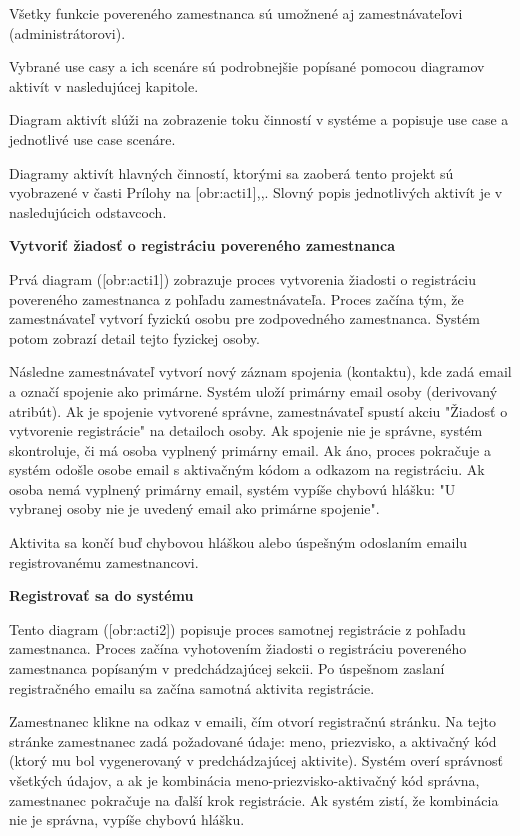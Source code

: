 Všetky funkcie povereného zamestnanca sú umožnené aj zamestnávateľovi (administrátorovi).

Vybrané use casy a ich scenáre sú podrobnejšie popísané pomocou diagramov aktivít v nasledujúcej kapitole.


Diagram aktivít slúži na zobrazenie toku činností v systéme a popisuje use case a jednotlivé use case scenáre.

Diagramy aktivít hlavných činností, ktorými sa zaoberá tento projekt sú vyobrazené v časti Prílohy na [obr:acti1],,. Slovný popis jednotlivých aktivít je v nasledujúcich odstavcoch.

\blank
\start\bf Vytvoriť žiadosť o registráciu povereného zamestnanca\stop

Prvá diagram ([obr:acti1]) zobrazuje proces vytvorenia žiadosti o registráciu povereného zamestnanca z pohľadu zamestnávateľa. Proces začína tým, že zamestnávateľ vytvorí fyzickú osobu pre zodpovedného zamestnanca. Systém potom zobrazí detail tejto fyzickej osoby. 

Následne zamestnávateľ vytvorí nový záznam spojenia (kontaktu), kde zadá email a označí spojenie ako primárne. Systém uloží primárny email osoby (derivovaný atribút). Ak je spojenie vytvorené správne, zamestnávateľ spustí akciu "Žiadosť o vytvorenie registrácie" na detailoch osoby. Ak spojenie nie je správne, systém skontroluje, či má osoba vyplnený primárny email. Ak áno, proces pokračuje a systém odošle osobe email s aktivačným kódom a odkazom na registráciu. Ak osoba nemá vyplnený primárny email, systém vypíše chybovú hlášku: "U vybranej osoby nie je uvedený email ako primárne spojenie".

Aktivita sa končí buď chybovou hláškou alebo úspešným odoslaním emailu registrovanému zamestnancovi.

\blank
\start\bf Registrovať sa do systému\stop

Tento diagram ([obr:acti2]) popisuje proces samotnej registrácie z pohľadu zamestnanca. Proces začína vyhotovením žiadosti o registráciu povereného zamestnanca popísaným v predchádzajúcej sekcii. Po úspešnom zaslaní registračného emailu sa začína samotná aktivita registrácie.

Zamestnanec klikne na odkaz v emaili, čím otvorí registračnú stránku. Na tejto stránke zamestnanec zadá požadované údaje: meno, priezvisko, a aktivačný kód (ktorý mu bol vygenerovaný v predchádzajúcej aktivite). Systém overí správnosť všetkých údajov, a ak je kombinácia meno-priezvisko-aktivačný kód správna, zamestnanec pokračuje na ďalší krok registrácie. Ak systém zistí, že kombinácia nie je správna, vypíše chybovú hlášku.

